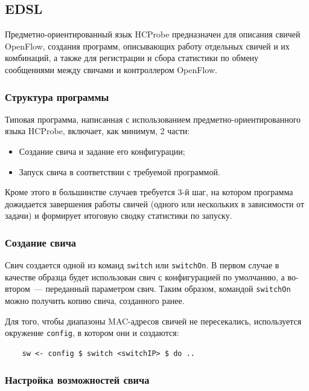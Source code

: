 \documentclass[9pt,a4paper]{article}
\begin{document}
\subsection{EDSL}

Предметно-ориентированный язык HCProbe предназначен для описания свичей
OpenFlow, создания программ, описывающих работу отдельных свичей и их
комбинаций, а также для регистрации и сбора статистики по обмену сообщениями
между свичами и контроллером OpenFlow.

\subsubsection{Структура программы}

Типовая программа, написанная с использованием предметно-ориентированного языка
HCProbe, включает, как минимум, 2 части:

\begin{itemize}
  \item Создание свича и задание его конфигурации;
  \item Запуск свича в соответствии с требуемой программой.
\end{itemize}

Кроме этого в большинстве случаев требуется 3-й шаг, на котором программа
дожидается завершения работы свичей (одного или нескольких в зависимости от
задачи) и формирует итоговую сводку статистики по запуску.

\subsubsection{Создание свича}

Свич создается одной из команд \lstinline!switch! или \lstinline!switchOn!. В
первом случае в качестве образца будет использован свич с конфигурацией по
умолчанию, а во-втором~--- переданный параметром свич. Таким образом, командой
\lstinline!switchOn! можно получить копию свича, созданного ранее.

Для того, чтобы диапазоны MAC-адресов свичей не пересекались, используется окружение
\lstinline!config!, в котором они и создаются:

\begin{lstlisting}
    sw <- config $ switch <switchIP> $ do ..
\end{lstlisting}%

\subsubsection{Настройка возможностей свича}
\end{document}
